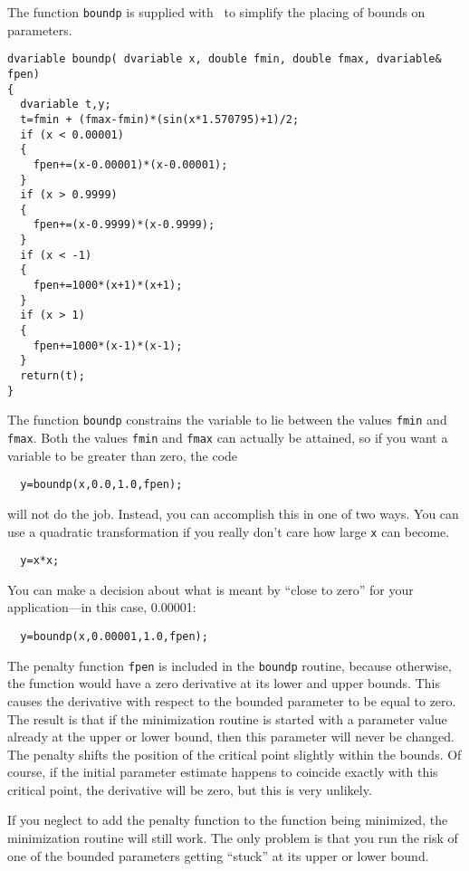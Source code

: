 \documentclass{admbmanual}
\begin{document}
The function \texttt{boundp} is supplied with \scAD\ to simplify the placing of
bounds on parameters.

\begin{lstlisting}
dvariable boundp( dvariable x, double fmin, double fmax, dvariable& fpen)
{
  dvariable t,y;
  t=fmin + (fmax-fmin)*(sin(x*1.570795)+1)/2;
  if (x < 0.00001)
  {
    fpen+=(x-0.00001)*(x-0.00001);
  }
  if (x > 0.9999)
  {
    fpen+=(x-0.9999)*(x-0.9999);
  }
  if (x < -1)
  {
    fpen+=1000*(x+1)*(x+1);
  }
  if (x > 1)
  {
    fpen+=1000*(x-1)*(x-1);
  }
  return(t);
}
\end{lstlisting}

The function \texttt{boundp} constrains the variable to lie between the values
\texttt{fmin} and \texttt{fmax}. Both the values \texttt{fmin} and \texttt{fmax}
can actually be attained, so if you want a variable to be greater than zero, the
code
\begin{lstlisting}
  y=boundp(x,0.0,1.0,fpen);
\end{lstlisting}
will not do the job. Instead, you can accomplish this in one of two ways. You
can use a quadratic transformation if you really don't care how large \texttt{x}
can become.
\begin{lstlisting}
  y=x*x;
\end{lstlisting}
You can make a decision about what is meant by ``close to zero'' for your
application---in this case, 0.00001:
\begin{lstlisting}
  y=boundp(x,0.00001,1.0,fpen);
\end{lstlisting}

The penalty function \texttt{fpen} is included in the \texttt{boundp} routine,
because otherwise, the function would have a zero derivative at its lower and
upper bounds. This causes the derivative with respect to the bounded parameter
to be equal to zero. The result is that if the minimization routine is started
with a parameter value already at the upper or lower bound, then this parameter
will never be changed. The penalty shifts the position of the critical point
slightly within the bounds. Of course, if the initial parameter estimate happens
to coincide exactly with this critical point, the derivative will be zero, but
this is very unlikely.

If you neglect to add the penalty function to the function being minimized, the
minimization routine will still work. The only problem is that you run the risk
of one of the bounded parameters getting ``stuck'' at its upper or lower bound.
\end{document}
